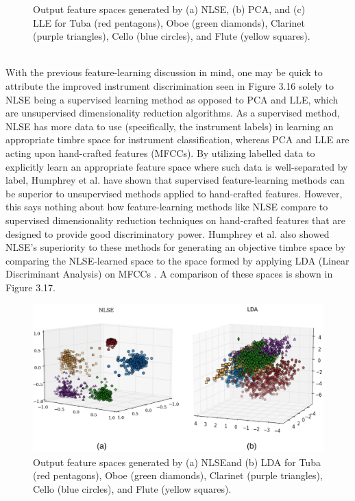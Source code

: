 \documentclass[a4paper,12pt]{report} 	%
\numberwithin{figure}{chapter}
\numberwithin{table}{chapter}
\numberwithin{equation}{chapter}
\begin{document}
\begin{flushleft}
\begin{figure}[h!]
\begin{center}
\caption[NLSE vs. PCA vs. LLE Instrument Clusters]{Output feature spaces generated by (a) NLSE, (b) PCA, and (c) LLE for Tuba (red pentagons), Oboe (green diamonds), Clarinet (purple triangles), Cello (blue circles), and Flute (yellow squares).}
\end{center}
\end{figure}
\\
With the previous feature-learning discussion in mind, one may be quick to attribute the improved instrument discrimination seen in Figure 3.16 solely to NLSE being a supervised learning method as opposed to PCA and LLE, which are unsupervised dimensionality reduction algorithms. As a supervised method, NLSE has more data to use (specifically, the instrument labels) in learning an appropriate timbre space for instrument classification, whereas PCA and LLE are acting upon hand-crafted features (MFCCs). By utilizing labelled data to explicitly learn an appropriate feature space where such data is well-separated by label, Humphrey et al. have shown that supervised feature-learning methods can be superior to unsupervised methods applied to hand-crafted features. However, this says nothing about how feature-learning methods like NLSE compare to supervised dimensionality reduction techniques on hand-crafted features that are designed to provide good discriminatory power. Humphrey et al. also showed NLSE's superiority to these methods for generating an objective timbre space by comparing the NLSE-learned space to the space formed by applying LDA (Linear Discriminant Analysis) on MFCCs \cite{humphrey2013feature}. A comparison of these spaces is shown in Figure 3.17.
\begin{figure}[h!]
\begin{center}
\includegraphics[width=\linewidth]{NLSECluster2}
\caption[NLSE vs. LDA Instrument Clusters]{Output feature spaces generated by (a) NLSEand (b) LDA for Tuba (red pentagons), Oboe (green diamonds), Clarinet (purple triangles), Cello (blue circles), and Flute (yellow squares).}

\end{center}
\end{figure}
\end{flushleft}
\end{document}
